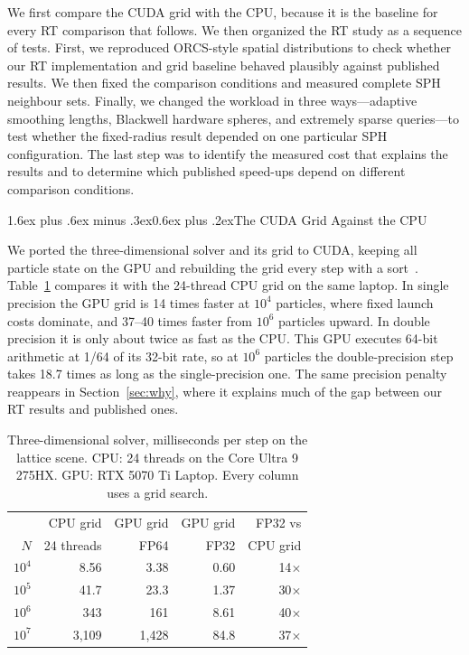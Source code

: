 \documentclass[conference]{IEEEtran}
\makeatletter
\renewcommand\subsection{\@startsection{subsection}{2}{\z@}%
  {1.6ex plus .6ex minus .3ex}{0.6ex plus .2ex}{\normalfont\normalsize\bfseries}}
\makeatother
\begin{document}
We first compare the CUDA grid with the CPU, because it is the baseline for every RT comparison that follows. We then organized the RT study as a sequence of tests. First, we reproduced ORCS-style spatial distributions to check whether our RT implementation and grid baseline behaved plausibly against published results. We then fixed the comparison conditions and measured complete SPH neighbour sets. Finally, we changed the workload in three ways---adaptive smoothing lengths, Blackwell hardware spheres, and extremely sparse queries---to test whether the fixed-radius result depended on one particular SPH configuration. The last step was to identify the measured cost that explains the results and to determine which published speed-ups depend on different comparison conditions.

\subsection{The CUDA Grid Against the CPU}

We ported the three-dimensional solver and its grid to CUDA, keeping all particle state on the GPU and rebuilding the grid every step with a sort~\cite{green2010cuda}. Table~\ref{tab:gpu} compares it with the 24-thread CPU grid on the same laptop. In single precision the GPU grid is 14 times faster at $10^4$ particles, where fixed launch costs dominate, and 37--40 times faster from $10^6$ particles upward. In double precision it is only about twice as fast as the CPU. This GPU executes 64-bit arithmetic at 1/64 of its 32-bit rate, so at $10^6$ particles the double-precision step takes 18.7 times as long as the single-precision one. The same precision penalty reappears in Section~\ref{sec:why}, where it explains much of the gap between our RT results and published ones.

\begin{table}[!htb]
\centering
\caption{Three-dimensional solver, milliseconds per step on the lattice scene. CPU: 24 threads on the Core Ultra 9 275HX. GPU: RTX 5070 Ti Laptop. Every column uses a grid search.}
\label{tab:gpu}
\footnotesize
\begin{tabular}{@{}rrrrr@{}}
\toprule
 & CPU grid & GPU grid & GPU grid & FP32 vs \\
$N$ & 24 threads & FP64 & FP32 & CPU grid \\
\midrule
$10^4$ & 8.56 & 3.38 & 0.60 & 14$\times$ \\
$10^5$ & 41.7 & 23.3 & 1.37 & 30$\times$ \\
$10^6$ & 343 & 161 & 8.61 & 40$\times$ \\
$10^7$ & 3,109 & 1,428 & 84.8 & 37$\times$ \\
\bottomrule
\end{tabular}
\end{table}
\end{document}
